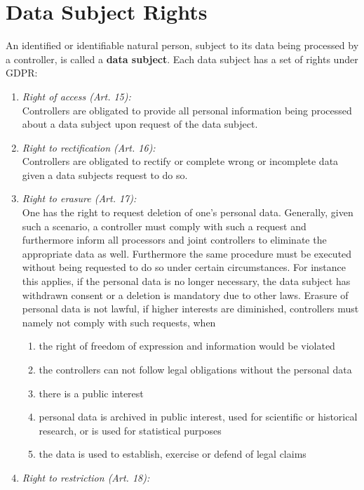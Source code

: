 \documentclass[a4paper,12pt]{report}
\begin{document}
	\section{Data Subject Rights}
	\startsection
	An identified or identifiable natural person, subject to its data being processed by a controller, is called a \textbf{data subject}.
	Each data subject has a set of rights under GDPR:
	\begin{enumerate}[]
		\item \textit{Right of access (Art. 15):} \\
		Controllers are obligated to provide all personal information being processed about a data subject upon request of the data subject.
		\item \textit{Right to rectification (Art. 16):} \\
		Controllers are obligated to rectify or complete wrong or incomplete data given a data subjects request to do so.
		\item \textit{Right to erasure (Art. 17):} \\
		One has the right to request deletion of one's personal data.
		Generally, given such a scenario, a controller must comply with such a request and furthermore inform all processors and joint controllers to eliminate the appropriate data as well.
		Furthermore the same procedure must be executed without being requested to do so under certain circumstances.
		For instance this applies, if the personal data is no longer necessary, the data subject has withdrawn consent or a deletion is mandatory due to other laws.
		Erasure of personal data is not lawful, if higher interests are diminished, controllers must namely not comply with such requests, when
		\begin{enumerate}
			\item the right of freedom of expression and information would be violated
			\item the controllers can not follow legal obligations without the personal data
			\item there is a public interest
			\item personal data is archived in public interest, used for scientific or historical research, or is used for statistical purposes
			\item the data is used to establish, exercise or defend of legal claims
		\end{enumerate}
		\item \textit{Right to restriction (Art. 18):} \\

\end{enumerate}
\end{document}
